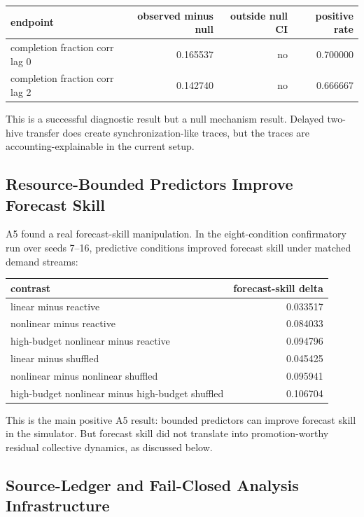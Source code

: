 \documentclass[11pt]{article}
\begin{document}
\begin{center}
\begin{tabular}{lrrr}
endpoint & observed minus null & outside null CI & positive rate \\
\hline
completion fraction corr lag 0 & 0.165537 & no & 0.700000 \\
completion fraction corr lag 2 & 0.142740 & no & 0.666667 \\
\end{tabular}
\end{center}

This is a successful diagnostic result but a null mechanism result. Delayed
two-hive transfer does create synchronization-like traces, but the traces are
accounting-explainable in the current setup.

\subsection{Resource-Bounded Predictors Improve Forecast Skill}

A5 found a real forecast-skill manipulation. In the eight-condition
confirmatory run over seeds 7--16, predictive conditions improved forecast
skill under matched demand streams:

\begin{center}
\begin{tabular}{lr}
contrast & forecast-skill delta \\
\hline
linear minus reactive & 0.033517 \\
nonlinear minus reactive & 0.084033 \\
high-budget nonlinear minus reactive & 0.094796 \\
linear minus shuffled & 0.045425 \\
nonlinear minus nonlinear shuffled & 0.095941 \\
high-budget nonlinear minus high-budget shuffled & 0.106704 \\
\end{tabular}
\end{center}

This is the main positive A5 result: bounded predictors can improve forecast
skill in the simulator. But forecast skill did not translate into
promotion-worthy residual collective dynamics, as discussed below.

\subsection{Source-Ledger and Fail-Closed Analysis Infrastructure}
\end{document}
